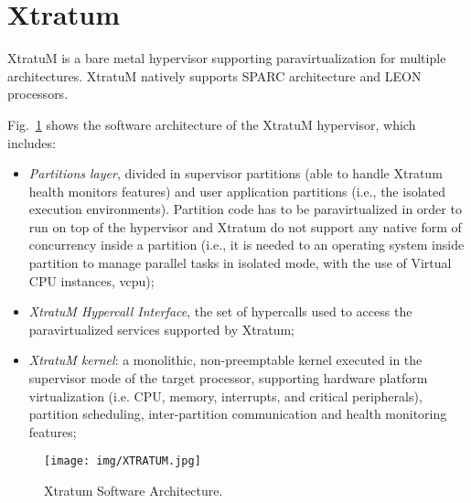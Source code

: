 \section{Xtratum}
%
XtratuM is a bare metal hypervisor supporting paravirtualization for multiple architectures. XtratuM natively supports SPARC architecture and LEON processors. \par
Fig.~\ref{fig3} shows the software architecture of the XtratuM hypervisor, which includes:
%
\begin{itemize}
    \item \textit{Partitions layer}, divided in supervisor partitions (able to handle Xtratum health monitors features) and user application partitions (i.e., the isolated execution environments). Partition code has to be paravirtualized in order to run on top of the hypervisor and Xtratum do not support any native form of concurrency inside a partition (i.e., it is needed to an operating system inside partition to manage parallel tasks in isolated mode, with the use of Virtual CPU instances, vcpu);
    \item \textit{XtratuM Hypercall Interface}, the set of hypercalls used to access the paravirtualized services supported by Xtratum;
    \item \textit{XtratuM kernel}: a monolithic, non-preemptable kernel executed in the supervisor mode of the target processor, supporting hardware platform virtualization (i.e. CPU, memory, interrupts, and critical peripherals), partition scheduling, inter-partition communication and health monitoring features;
\end{itemize}
%
\begin{figure}[htbp]
\centerline{\texttt{[image: img/XTRATUM.jpg]}}
\caption{Xtratum Software Architecture.}
\label{fig3}
\end{figure}
%
